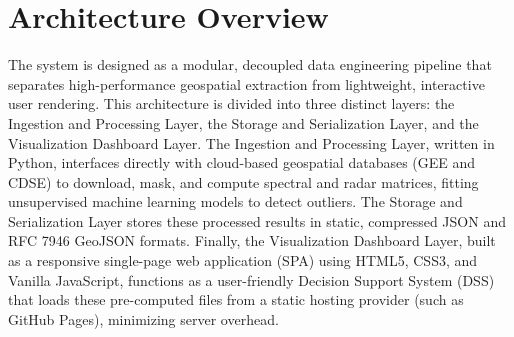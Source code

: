 
\section{Architecture Overview}
The system is designed as a modular, decoupled data engineering pipeline that separates high-performance geospatial extraction from lightweight, interactive user rendering. This architecture is divided into three distinct layers: the Ingestion and Processing Layer, the Storage and Serialization Layer, and the Visualization Dashboard Layer. The Ingestion and Processing Layer, written in Python, interfaces directly with cloud-based geospatial databases (GEE and CDSE) to download, mask, and compute spectral and radar matrices, fitting unsupervised machine learning models to detect outliers. The Storage and Serialization Layer stores these processed results in static, compressed JSON and RFC 7946 GeoJSON formats. Finally, the Visualization Dashboard Layer, built as a responsive single-page web application (SPA) using HTML5, CSS3, and Vanilla JavaScript, functions as a user-friendly Decision Support System (DSS) that loads these pre-computed files from a static hosting provider (such as GitHub Pages), minimizing server overhead.

